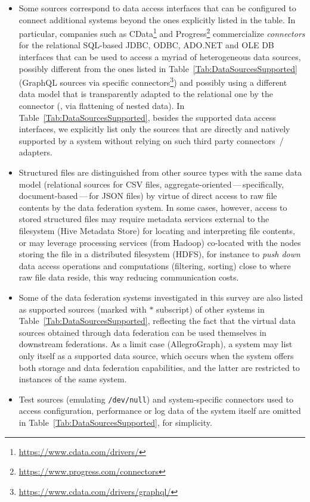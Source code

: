 \documentclass[
  sw             %
]
{iosart2x}
\begin{document}
\begin{itemize}
	\item
	Some sources correspond to data access interfaces that can be configured to connect additional systems beyond the ones explicitly listed in the table.
	In particular, companies such as CData\footnote{\url{https://www.cdata.com/drivers/}} and Progress\footnote{\url{https://www.progress.com/connectors}} commercialize \emph{connectors} for the relational SQL-based JDBC, ODBC, ADO.NET and OLE DB interfaces that can be used to access a myriad of heterogeneous data sources, possibly different from the ones listed in Table~\ref{Tab:DataSourcesSupported} (\eg GraphQL sources via specific connectors\footnote{\url{https://www.cdata.com/drivers/graphql/}}) and possibly using a different data model that is transparently adapted to the relational one by the connector (\eg, via flattening of nested data).
	In Table~\ref{Tab:DataSourcesSupported}, besides the supported data access interfaces, we explicitly list only the sources that are directly and natively supported by a system without relying on such third party connectors~/ adapters.
	\item
	Structured files are distinguished from other source types with the same data model (\eg relational sources for CSV files, aggregate-oriented\,---\,specifically, document-based\,---\,for JSON files) by virtue of direct access to raw file contents by the data federation system.
	In some cases, however, access to stored structured files may require metadata services external to the filesystem (\eg Hive Metadata Store) for locating and interpreting file contents, or may leverage processing services (\eg from Hadoop) co-located with the nodes storing the file in a distributed filesystem (\eg HDFS), for instance to \emph{push down} data access operations and computations (\eg filtering, sorting) close to where raw file data reside, this way reducing communication costs.
	\item
	Some of the data federation systems investigated in this survey are also listed as supported sources (marked with $\ast$ subscript) of other systems in Table~\ref{Tab:DataSourcesSupported}, reflecting the fact that the virtual data sources obtained through data federation can be used themselves in downstream federations.
	As a limit case (\eg AllegroGraph), a system may list only itself as a supported data source, which occurs when the system offers both storage and data federation capabilities, and the latter are restricted to instances of the same system.
	\item
	Test sources (\eg emulating \texttt{/dev/null}) and system-specific connectors used to access configuration, performance or log data of the system itself are omitted in Table~\ref{Tab:DataSourcesSupported}, for simplicity.
\end{itemize}







\end{document}
